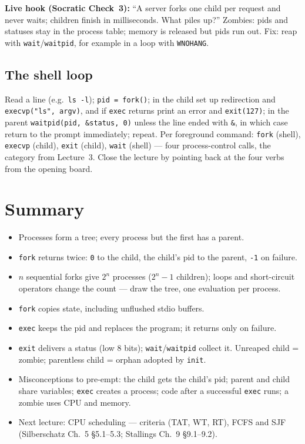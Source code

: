 \documentclass[11pt]{article}
\begin{document}
\textbf{Live hook (Socratic Check~3):} ``A server forks one child per request and never waits; children finish in milliseconds. What piles up?'' Zombies: pids and statuses stay in the process table; memory is released but pids run out. Fix: reap with \texttt{wait}/\texttt{waitpid}, for example in a loop with \texttt{WNOHANG}.

\subsection*{The shell loop}

Read a line (e.g.\ \texttt{ls -l}); \texttt{pid = fork()}; in the child set up redirection and \texttt{execvp("ls", argv)}, and if \texttt{exec} returns print an error and \texttt{exit(127)}; in the parent \texttt{waitpid(pid, \&status, 0)} unless the line ended with \texttt{\&}, in which case return to the prompt immediately; repeat. Per foreground command: \texttt{fork} (shell), \texttt{execvp} (child), \texttt{exit} (child), \texttt{wait} (shell) --- four process-control calls, the category from Lecture~3. Close the lecture by pointing back at the four verbs from the opening board.

\section{Summary}

\begin{itemize}
  \item Processes form a tree; every process but the first has a parent.
  \item \texttt{fork} returns twice: \texttt{0} to the child, the child's pid to the parent, \texttt{-1} on failure.
  \item $n$ sequential forks give $2^n$ processes ($2^n - 1$ children); loops and short-circuit operators change the count --- draw the tree, one evaluation per process.
  \item \texttt{fork} copies state, including unflushed stdio buffers.
  \item \texttt{exec} keeps the pid and replaces the program; it returns only on failure.
  \item \texttt{exit} delivers a status (low 8 bits); \texttt{wait}/\texttt{waitpid} collect it. Unreaped child = zombie; parentless child = orphan adopted by \texttt{init}.
  \item Misconceptions to pre-empt: the child gets the child's pid; parent and child share variables; \texttt{exec} creates a process; code after a successful \texttt{exec} runs; a zombie uses CPU and memory.
  \item Next lecture: CPU scheduling --- criteria (TAT, WT, RT), FCFS and SJF (Silberschatz Ch.~5 \S5.1--5.3; Stallings Ch.~9 \S9.1--9.2).
\end{itemize}
\end{document}
